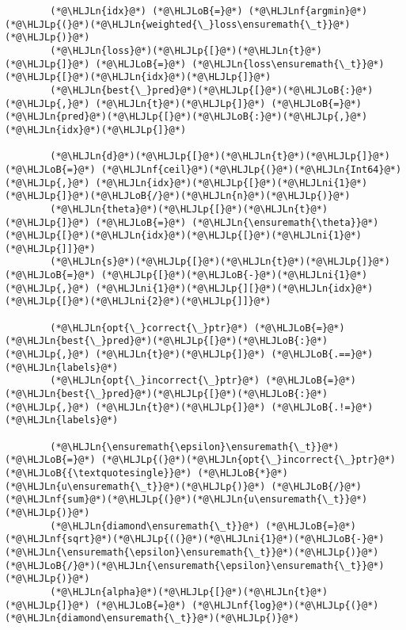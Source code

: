 \documentclass[12pt,a4paper]{article}
\newcommand{\HLJLn}[1]{#1}
\newcommand{\HLJLnf}[1]{\textcolor[RGB]{66,102,213}{#1}}
\newcommand{\HLJLni}[1]{\textcolor[RGB]{59,151,46}{#1}}
\newcommand{\HLJLoB}[1]{\textcolor[RGB]{102,102,102}{\textbf{#1}}}
\newcommand{\HLJLp}[1]{#1}
\begin{document}
\begin{lstlisting}
        (*@\HLJLn{idx}@*) (*@\HLJLoB{=}@*) (*@\HLJLnf{argmin}@*)(*@\HLJLp{(}@*)(*@\HLJLn{weighted{\_}loss\ensuremath{\_t}}@*)(*@\HLJLp{)}@*)
        (*@\HLJLn{loss}@*)(*@\HLJLp{[}@*)(*@\HLJLn{t}@*)(*@\HLJLp{]}@*) (*@\HLJLoB{=}@*) (*@\HLJLn{loss\ensuremath{\_t}}@*)(*@\HLJLp{[}@*)(*@\HLJLn{idx}@*)(*@\HLJLp{]}@*)
        (*@\HLJLn{best{\_}pred}@*)(*@\HLJLp{[}@*)(*@\HLJLoB{:}@*)(*@\HLJLp{,}@*) (*@\HLJLn{t}@*)(*@\HLJLp{]}@*) (*@\HLJLoB{=}@*) (*@\HLJLn{pred}@*)(*@\HLJLp{[}@*)(*@\HLJLoB{:}@*)(*@\HLJLp{,}@*) (*@\HLJLn{idx}@*)(*@\HLJLp{]}@*)
        
        (*@\HLJLn{d}@*)(*@\HLJLp{[}@*)(*@\HLJLn{t}@*)(*@\HLJLp{]}@*) (*@\HLJLoB{=}@*) (*@\HLJLnf{ceil}@*)(*@\HLJLp{(}@*)(*@\HLJLn{Int64}@*)(*@\HLJLp{,}@*) (*@\HLJLn{idx}@*)(*@\HLJLp{[}@*)(*@\HLJLni{1}@*)(*@\HLJLp{]}@*)(*@\HLJLoB{/}@*)(*@\HLJLn{n}@*)(*@\HLJLp{)}@*)
        (*@\HLJLn{theta}@*)(*@\HLJLp{[}@*)(*@\HLJLn{t}@*)(*@\HLJLp{]}@*) (*@\HLJLoB{=}@*) (*@\HLJLn{\ensuremath{\theta}}@*)(*@\HLJLp{[}@*)(*@\HLJLn{idx}@*)(*@\HLJLp{[}@*)(*@\HLJLni{1}@*)(*@\HLJLp{]]}@*)
        (*@\HLJLn{s}@*)(*@\HLJLp{[}@*)(*@\HLJLn{t}@*)(*@\HLJLp{]}@*) (*@\HLJLoB{=}@*) (*@\HLJLp{[}@*)(*@\HLJLoB{-}@*)(*@\HLJLni{1}@*)(*@\HLJLp{,}@*) (*@\HLJLni{1}@*)(*@\HLJLp{][}@*)(*@\HLJLn{idx}@*)(*@\HLJLp{[}@*)(*@\HLJLni{2}@*)(*@\HLJLp{]]}@*)

        (*@\HLJLn{opt{\_}correct{\_}ptr}@*) (*@\HLJLoB{=}@*) (*@\HLJLn{best{\_}pred}@*)(*@\HLJLp{[}@*)(*@\HLJLoB{:}@*)(*@\HLJLp{,}@*) (*@\HLJLn{t}@*)(*@\HLJLp{]}@*) (*@\HLJLoB{.==}@*) (*@\HLJLn{labels}@*)
        (*@\HLJLn{opt{\_}incorrect{\_}ptr}@*) (*@\HLJLoB{=}@*) (*@\HLJLn{best{\_}pred}@*)(*@\HLJLp{[}@*)(*@\HLJLoB{:}@*)(*@\HLJLp{,}@*) (*@\HLJLn{t}@*)(*@\HLJLp{]}@*) (*@\HLJLoB{.!=}@*) (*@\HLJLn{labels}@*)

        (*@\HLJLn{\ensuremath{\epsilon}\ensuremath{\_t}}@*) (*@\HLJLoB{=}@*) (*@\HLJLp{(}@*)(*@\HLJLn{opt{\_}incorrect{\_}ptr}@*)(*@\HLJLoB{{\textquotesingle}}@*) (*@\HLJLoB{*}@*) (*@\HLJLn{u\ensuremath{\_t}}@*)(*@\HLJLp{)}@*) (*@\HLJLoB{/}@*) (*@\HLJLnf{sum}@*)(*@\HLJLp{(}@*)(*@\HLJLn{u\ensuremath{\_t}}@*)(*@\HLJLp{)}@*)
        (*@\HLJLn{diamond\ensuremath{\_t}}@*) (*@\HLJLoB{=}@*) (*@\HLJLnf{sqrt}@*)(*@\HLJLp{((}@*)(*@\HLJLni{1}@*)(*@\HLJLoB{-}@*)(*@\HLJLn{\ensuremath{\epsilon}\ensuremath{\_t}}@*)(*@\HLJLp{)}@*)(*@\HLJLoB{/}@*)(*@\HLJLn{\ensuremath{\epsilon}\ensuremath{\_t}}@*)(*@\HLJLp{)}@*)
        (*@\HLJLn{alpha}@*)(*@\HLJLp{[}@*)(*@\HLJLn{t}@*)(*@\HLJLp{]}@*) (*@\HLJLoB{=}@*) (*@\HLJLnf{log}@*)(*@\HLJLp{(}@*)(*@\HLJLn{diamond\ensuremath{\_t}}@*)(*@\HLJLp{)}@*)
        

\end{lstlisting}
\end{document}
